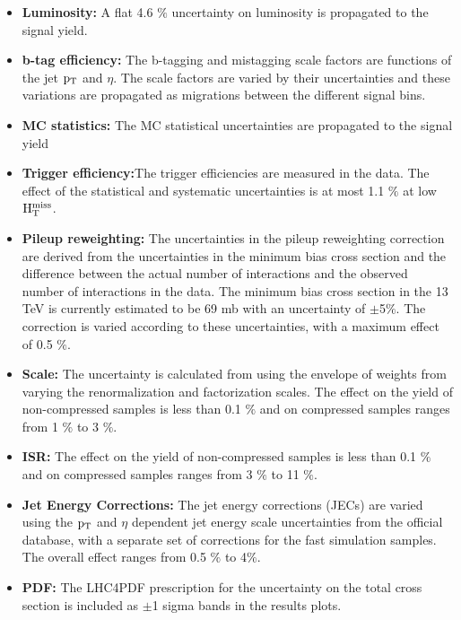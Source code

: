\begin{itemize}

\item {\bf Luminosity:} A flat 4.6 $\%$ uncertainty on luminosity is propagated to the signal yield. 

\item {\bf b-tag efficiency:} The b-tagging and mistagging scale factors are functions of the jet
 $\rm p_{T}$ and $\eta$. The scale factors are varied by their uncertainties and these variations are propagated as migrations between the different signal bins.

\item {\bf MC statistics:} The MC statistical uncertainties are propagated to the signal yield 

\item {\bf Trigger efficiency:}The trigger efficiencies are measured in the data.
The effect of the statistical and systematic uncertainties is at most 1.1 $\%$ at low $\rm H_{T}^{miss}$.

\item {\bf Pileup reweighting: }The uncertainties in the pileup reweighting correction are derived from the uncertainties in the minimum bias cross section and the difference between the actual number of interactions and the observed number of interactions in the data. The minimum bias cross section in the 13 TeV is currently estimated to be 69 mb with an uncertainty of $\pm$5$\%$. The correction is varied according to these uncertainties, with a maximum effect of 0.5 $\%$.

\item {\bf Scale:} The uncertainty is calculated from using the envelope of weights from varying the renormalization and factorization scales. The effect on the yield of non-compressed samples is less than 0.1 $\%$ and on compressed samples ranges from 1 $\%$ to 3 $\%$.

\item {\bf ISR: } The effect on the yield of non-compressed samples is less than 0.1 $\%$ and on compressed samples ranges from 3 $\%$ to 11 $\%$.


\item {\bf Jet Energy Corrections: } The jet energy corrections (JECs) are varied using the $\rm p_{T}$
and $\eta$ dependent jet energy scale uncertainties from the official database, with a separate set of corrections for the fast simulation samples. The overall effect ranges from 0.5 $\%$ to 4$\%$. 

\item {\bf PDF: } The LHC4PDF prescription for the uncertainty on the total cross section is included as $\pm$1 sigma bands in the results plots. 

\end{itemize}
 




